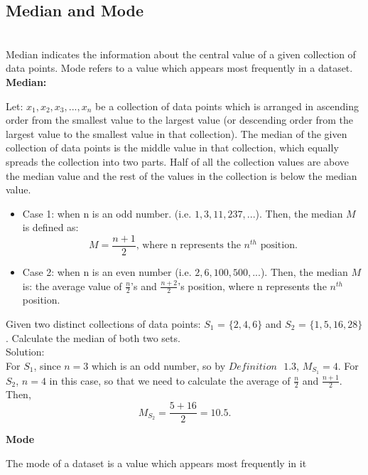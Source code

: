 \subsection{Median and Mode}\\

\noindent
Median indicates the information about the central value of a given collection of data points. Mode refers to a value which appears most frequently in a dataset.\\

\noindent
\textbf{Median:}
\begin{definition}
Let: $x_1, x_2, x_3, ... , x_n$ be a collection of data points which is arranged in ascending order from the smallest value to the largest value (or descending order from the largest value to the smallest value in that collection). The median of the given collection of data points is the middle value in that collection, which equally spreads the collection into two parts. Half of all the collection values are above the median value and the rest of the values in the collection is below the median value.
\begin{itemize}
 \item Case 1: when n is an odd number. (i.e. $1, 3, 11, 237,...$). Then, the median $M$ is defined as: \[ M = \frac{n+1}{2} \text{, where n represents the $n^{th}$ position}.\]
 \item Case 2: when n is an even number (i.e. $2, 6, 100, 500,...$). Then, the median $M$ is: the average value of $\frac{n}{2}$'s and $\frac{n+2}{2}$'s position, where n represents the $n^{th}$ position.
 \end{itemize}
\end{definition}
\begin{example}
Given two distinct collections of data points: $S_1$ = $\{2, 4, 6\}$ and $S_2$ = $\{1, 5, 16, 28\}$. Calculate the median of both two sets.\\
Solution: \\
For $S_1$, since $n = 3$ which is an odd number, so by $Definition \text{ } 1.3$, $M_{S_1} = 4$. For $S_2$, $n = 4$ in this case, so that we need to calculate the average of $\frac{n}{2}$ and $\frac{n+1}{2}$. Then, \[ M_{S_2} = \frac{5+16}{2} = 10.5.\]
\end{example}

\noindent
\textbf{Mode}
\begin{definition}
The mode of a dataset is a value which appears most frequently in it
\end{definition}

